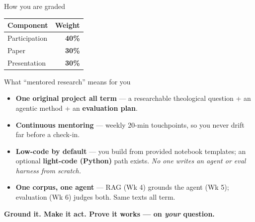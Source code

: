 \begin{frame}{How you are graded}
  \vfill
  \begin{center}
    \begin{tabular}{@{}p{5.5cm}r@{}}
      \toprule
      \Large\textbf{Component} & \Large\textbf{Weight}\\
      \midrule
      \Large Participation   & \Large\color{cAgent}\textbf{40\%}\\[4pt]
      \Large Paper           & \Large\color{cRAG}\textbf{30\%}\\[4pt]
      \Large Presentation    & \Large\color{cEval}\textbf{30\%}\\
      \bottomrule
    \end{tabular}
  \end{center}
  \vfill
\end{frame}

\begin{frame}{What ``mentored research'' means for you}
  \setlength{\leftmargini}{16pt}
  \begin{itemize}\small
    \item \textbf{One original project all term} --- a researchable
      theological question + an agentic method + an \textbf{evaluation plan}.
    \item \textbf{Continuous mentoring} --- weekly 20-min touchpoints, so you
      never drift far before a check-in.
    \item \textbf{Low-code by default} --- you build from provided notebook
      templates; an optional \textbf{light-code (Python)} path exists.
      \emph{No one writes an agent or eval harness from scratch.}
    \item \textbf{One corpus, one agent} --- RAG (Wk 4) grounds the agent
      (Wk 5); evaluation (Wk 6) judges both. Same texts all term.
  \end{itemize}
  \vspace{4pt}
  \begin{center}\small\color{labnavy}\bfseries Ground it. Make it act. Prove it works --- on \emph{your} question.\end{center}
\end{frame}

